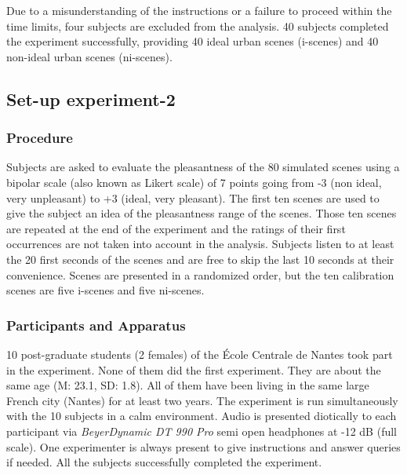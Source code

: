 \documentclass[twoside,twocolumn]{article}
\begin{document}
Due to a misunderstanding of the instructions or a failure to proceed within the time limits, four subjects are excluded from the analysis. 40 subjects completed the experiment successfully, providing 40 ideal urban scenes (i-scenes) and 40 non-ideal urban scenes (ni-scenes). 

\subsection{Set-up experiment-2}
\label{sec:Experiment-2}
\subsubsection*{Procedure} 

Subjects are asked to evaluate the pleasantness of the 80 simulated scenes using a bipolar scale (also known as Likert scale) of 7 points going from -3 (non ideal, very unpleasant)  to +3 (ideal, very pleasant). The first ten scenes are used to give the subject an idea of the pleasantness range of the scenes. Those ten scenes are repeated at the end of the experiment and the ratings of their first occurrences are not taken into account in the analysis. Subjects listen to at least the 20 first seconds of the scenes and are free to skip the last 10 seconds at their convenience. Scenes are presented in a randomized order, but the ten calibration scenes are five i-scenes and five ni-scenes.  

\subsubsection*{Participants and Apparatus}

10 post-graduate students (2 females) of the {\'E}cole Centrale de Nantes took part in the experiment. None of them did the first experiment. They are about the same age (M: 23.1, SD: 1.8). All of them have been living in the same large French city (Nantes) for at least two years. The experiment is run simultaneously with the 10 subjects in a calm environment. Audio is presented diotically to each participant via \textit{BeyerDynamic DT 990 Pro} semi open headphones at -12 dB (full scale). One experimenter is always present to give instructions and answer queries if needed. All the  subjects successfully completed the experiment. 
\end{document}

